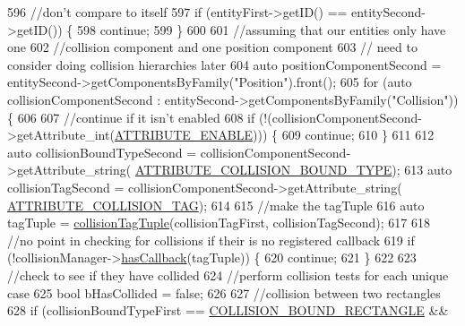 \begin{DoxyCode}
596             \textcolor{comment}{//don't compare to itself}
597             \textcolor{keywordflow}{if} (entityFirst->getID() == entitySecond->getID()) \{
598                 \textcolor{keywordflow}{continue};
599             \}
600 
601             \textcolor{comment}{//assuming that our entities only have one}
602             \textcolor{comment}{//collision component and one position component}
603             \textcolor{comment}{//  need to consider doing collision hierarchies later}
604             \textcolor{keyword}{auto} positionComponentSecond = entitySecond->getComponentsByFamily(\textcolor{stringliteral}{"Position"}).front();
605             \textcolor{keywordflow}{for} (\textcolor{keyword}{auto} collisionComponentSecond : entitySecond->getComponentsByFamily(\textcolor{stringliteral}{"Collision"})) \{
606 
607             \textcolor{comment}{//continue if it isn't enabled}
608             \textcolor{keywordflow}{if} (!(collisionComponentSecond->getAttribute\_int(\hyperlink{_a_e___attributes_8h_a4c775095baf8a9c99621ad9ad3b622db}{ATTRIBUTE\_ENABLE}))) \{
609                 \textcolor{keywordflow}{continue};
610             \}
611 
612             \textcolor{keyword}{auto} collisionBoundTypeSecond = collisionComponentSecond->getAttribute\_string(
      \hyperlink{_a_e___attributes_8h_a22ab960bb5b8b4b1350c7a25cadc49a5}{ATTRIBUTE\_COLLISION\_BOUND\_TYPE});
613             \textcolor{keyword}{auto} collisionTagSecond = collisionComponentSecond->getAttribute\_string(
      \hyperlink{_a_e___attributes_8h_a26b14cbbf2e63e42061d132e25412f59}{ATTRIBUTE\_COLLISION\_TAG});
614 
615             \textcolor{comment}{//make the tagTuple}
616             \textcolor{keyword}{auto} tagTuple = \hyperlink{_collision_manager_8h_a59fec3c97983b1c074529cfdd245515a}{collisionTagTuple}(collisionTagFirst, collisionTagSecond);
617 
618             \textcolor{comment}{//no point in checking for collisions if their is no registered callback}
619             \textcolor{keywordflow}{if} (!collisionManager->\hyperlink{class_collision_manager_a98395760494f7976f75c1d50072dcc5a}{hasCallback}(tagTuple)) \{
620                 \textcolor{keywordflow}{continue};
621             \}
622 
623             \textcolor{comment}{//check to see if they have collided}
624             \textcolor{comment}{//perform collision tests for each unique case}
625             \textcolor{keywordtype}{bool} bHasCollided = \textcolor{keyword}{false};
626 
627             \textcolor{comment}{//collision between two rectangles}
628             \textcolor{keywordflow}{if} (collisionBoundTypeFirst == \hyperlink{_a_e___attributes_8h_a3a31a6297a55375fdc090f881de08327}{COLLISION\_BOUND\_RECTANGLE} &&

\end{DoxyCode}
